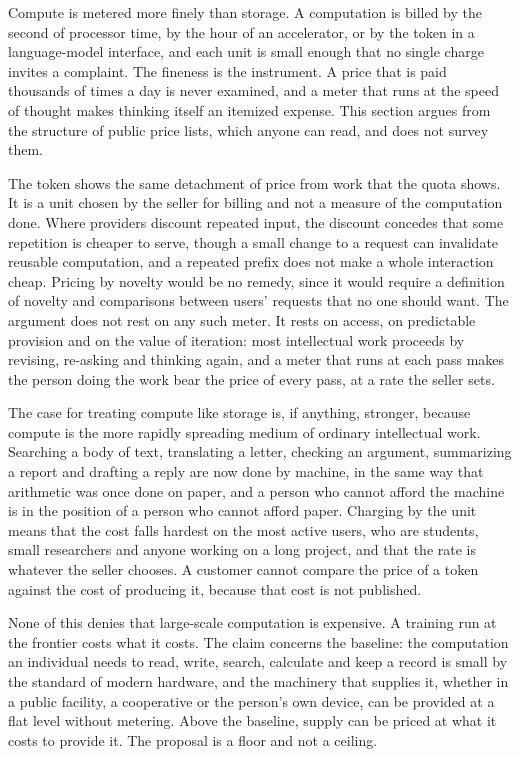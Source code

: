 \documentclass[11pt]{article}
\begin{document}
Compute is metered more finely than storage. A computation is billed by the second of processor time, by the hour of an accelerator, or by the token in a language-model interface, and each unit is small enough that no single charge invites a complaint. The fineness is the instrument. A price that is paid thousands of times a day is never examined, and a meter that runs at the speed of thought makes thinking itself an itemized expense. This section argues from the structure of public price lists, which anyone can read, and does not survey them.

The token shows the same detachment of price from work that the quota shows. It is a unit chosen by the seller for billing and not a measure of the computation done. Where providers discount repeated input, the discount concedes that some repetition is cheaper to serve, though a small change to a request can invalidate reusable computation, and a repeated prefix does not make a whole interaction cheap. Pricing by novelty would be no remedy, since it would require a definition of novelty and comparisons between users' requests that no one should want. The argument does not rest on any such meter. It rests on access, on predictable provision and on the value of iteration: most intellectual work proceeds by revising, re-asking and thinking again, and a meter that runs at each pass makes the person doing the work bear the price of every pass, at a rate the seller sets.

The case for treating compute like storage is, if anything, stronger, because compute is the more rapidly spreading medium of ordinary intellectual work. Searching a body of text, translating a letter, checking an argument, summarizing a report and drafting a reply are now done by machine, in the same way that arithmetic was once done on paper, and a person who cannot afford the machine is in the position of a person who cannot afford paper. Charging by the unit means that the cost falls hardest on the most active users, who are students, small researchers and anyone working on a long project, and that the rate is whatever the seller chooses. A customer cannot compare the price of a token against the cost of producing it, because that cost is not published.

None of this denies that large-scale computation is expensive. A training run at the frontier costs what it costs. The claim concerns the baseline: the computation an individual needs to read, write, search, calculate and keep a record is small by the standard of modern hardware, and the machinery that supplies it, whether in a public facility, a cooperative or the person's own device, can be provided at a flat level without metering. Above the baseline, supply can be priced at what it costs to provide it. The proposal is a floor and not a ceiling.
\end{document}
